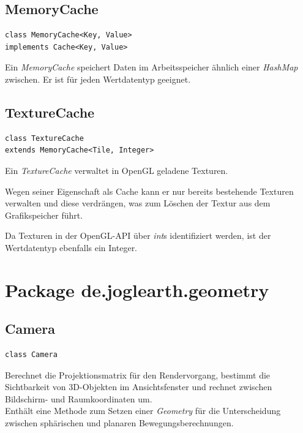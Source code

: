 \documentclass[10pt]{scrreprt}
\begin{document}
\vspace{5mm}
\subsection*{MemoryCache}
\begin{lstlisting}
class MemoryCache<Key, Value>
implements Cache<Key, Value>
\end{lstlisting}
Ein \textit{MemoryCache} speichert Daten im Arbeitsspeicher ähnlich einer \textit{HashMap} zwischen. Er ist für jeden Wertdatentyp geeignet.\\

\vspace{5mm}
\subsection*{TextureCache}
\begin{lstlisting}
class TextureCache
extends MemoryCache<Tile, Integer>
\end{lstlisting}
Ein \textit{TextureCache} verwaltet in OpenGL geladene Texturen.

Wegen seiner Eigenschaft als Cache kann er nur bereits bestehende Texturen verwalten und diese verdrängen, was zum Löschen der Textur aus dem Grafikspeicher führt. 

Da Texturen in der OpenGL-API über \textit{int}s identifiziert werden, ist der Wertdatentyp ebenfalls ein Integer.\\


\vspace{5mm}
\section{Package de.joglearth.geometry}
\subsection*{Camera}
\begin{lstlisting}
class Camera
\end{lstlisting}
Berechnet die Projektionsmatrix für den Rendervorgang, bestimmt die Sichtbarkeit von 3D-Objekten im Ansichtsfenster und rechnet zwischen Bildschirm- und Raumkoordinaten um.\\
Enthält eine Methode zum Setzen einer \textit{Geometry} für die Unterscheidung zwischen sphärischen und planaren Bewegungsberechnungen.\\
\end{document}
